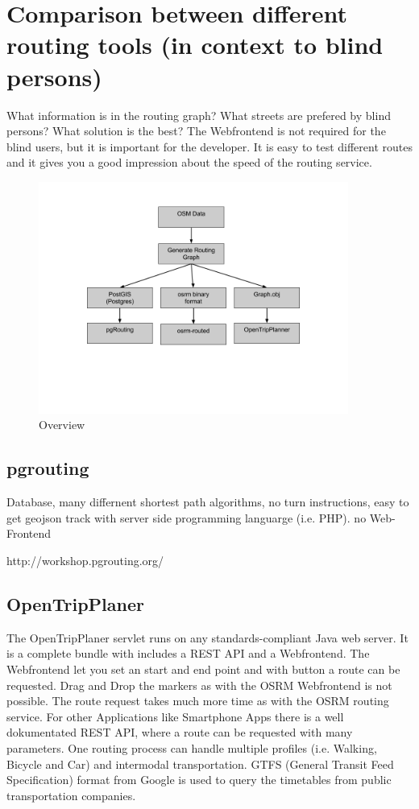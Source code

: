 \documentclass{sig-alternate}
\begin{document}
\section{Comparison between different routing tools (in context to blind persons)}

What information is in the routing graph? What streets are prefered by blind persons? What solution is the best?
The Webfrontend is not required for the blind users, but it is important for the developer. It is easy to test different routes and it gives you a good impression about the speed of the routing service.

\begin{figure}
\centering
\includegraphics[width=4in]{Overview.png}
\caption{Overview}
\end{figure}

\subsection{pgrouting\cite{pgrouting}}
Database, many differnent shortest path algorithms, no turn instructions, easy to get geojson track with server side programming languarge (i.e. PHP). no Web-Frontend

http://workshop.pgrouting.org/



\subsection{OpenTripPlaner}
 
The OpenTripPlaner servlet runs on any standards-compliant Java web server. It is a complete bundle with includes a REST API and a Webfrontend. The Webfrontend let you set an start and end point and with button a route can be requested. Drag and Drop the markers as with the OSRM Webfrontend is not possible. The route request takes much more time as with the OSRM routing service. For other Applications like Smartphone Apps there is a well dokumentated REST API, where a route can be requested with many parameters. One routing process can handle multiple profiles (i.e. Walking, Bicycle and Car) and intermodal transportation. GTFS (General Transit Feed Specification) format from Google is used to query the timetables from public transportation companies. 
\end{document}
